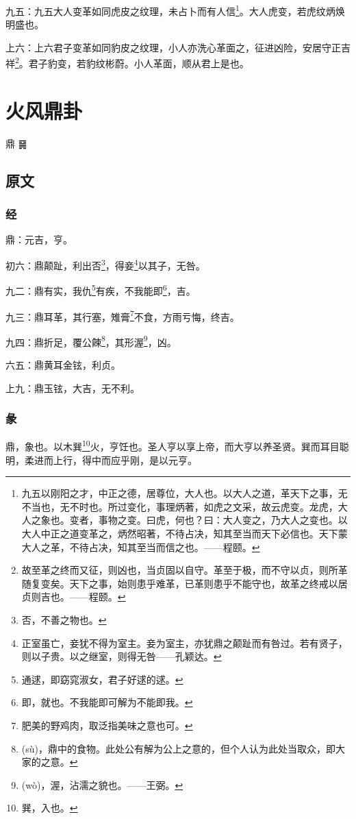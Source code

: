\documentclass[12pt,oneside]{book}
\begin{document}
九五：九五大人变革如同虎皮之纹理，未占卜而有人信\footnote{九五以刚阳之才，中正之德，居尊位，大人也。以大人之道，革天下之事，无不当也，无不时也。所过变化，事理炳著，如虎之文采，故云虎变。龙虎，大人之象也。变者，事物之变。曰虎，何也？曰：大人变之，乃大人之变也。以大人中正之道变革之，炳然昭著，不待占决，知其至当而天下必信也。天下蒙大人之革，不待占决，知其至当而信之也。——程颐。}。大人虎变，若虎纹炳焕明盛也。

上六：上六君子变革如同豹皮之纹理，小人亦洗心革面之，征进凶险，安居守正吉祥\footnote{故至革之终而又征，则凶也，当贞固以自守。革至于极，而不守以贞，则所革随复变矣。天下之事，始则患乎难革，已革则患乎不能守也，故革之终戒以居贞则吉也。——程颐。}。君子豹变，若豹纹彬蔚。小人革面，顺从君上是也。


\chapter{火风鼎卦}
鼎 {\large ䷱}

\section{原文}

\subsection{经}
鼎：元吉，亨。

初六：鼎颠趾，利出否\footnote{否，不善之物也。}，得妾\footnote{正室虽亡，妾犹不得为室主。妾为室主，亦犹鼎之颠趾而有咎过。若有贤子，则以子贵。以之继室，则得无咎——孔颖达。}以其子，无咎。

九二：鼎有实，我仇\footnote{通逑，即窈窕淑女，君子好逑的逑。}有疾，不我能即\footnote{即，就也。不我能即可解为不能即我。}，吉。

九三：鼎耳革，其行塞，雉膏\footnote{肥美的野鸡肉，取泛指美味之意也可。}不食，方雨亏悔，终吉。

九四：鼎折足，覆公餗\footnote{(sù)，鼎中的食物。此处公有解为公上之意的，但个人认为此处当取众，即大家的之意。}，其形渥\footnote{(wò)，渥，沾濡之貌也。——王弼。}，凶。

六五：鼎黄耳金铉，利贞。

上九：鼎玉铉，大吉，无不利。

\subsection{彖}
鼎，象也。以木巽\footnote{巽，入也。}火，亨饪也。圣人亨以享上帝，而大亨以养圣贤。巽而耳目聪明，柔进而上行，得中而应乎刚，是以元亨。
\end{document}
